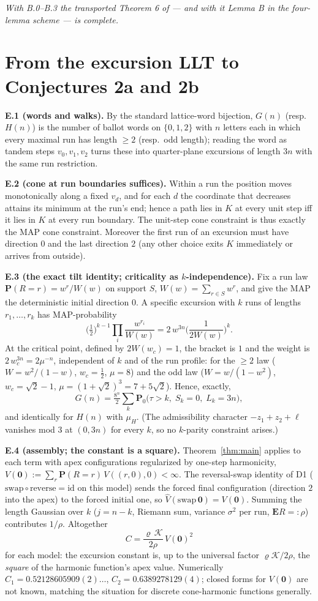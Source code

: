 \documentclass[11pt]{article}
\newcommand{\E}{\mathbf{E}}\newcommand{\Lat}{\mathcal{L}}\renewcommand{\Pr}{\mathbf{P}}
\begin{document}
\emph{With B.0--B.3 the transported Theorem 6 of \cite{DZ} --- and with it Lemma B in the
four-lemma scheme --- is complete.}

\section{From the excursion LLT to Conjectures 2a and 2b}
\textbf{E.1 (words and walks).} By the standard lattice-word bijection, $G(n)$ (resp.\
$H(n)$) is the number of ballot words on $\{0,1,2\}$ with $n$ letters each in which every
maximal run has length $\ge2$ (resp.\ odd length); reading the word as tandem steps
$v_0,v_1,v_2$ turns these into quarter-plane excursions of length $3n$ with the same run
restriction.

\textbf{E.2 (cone at run boundaries suffices).} Within a run the position moves
monotonically along a fixed $v_d$, and for each $d$ the coordinate that decreases attains
its minimum at the run's end; hence a path lies in $K$ at every unit step iff it lies in
$K$ at every run boundary. The unit-step cone constraint is thus exactly the MAP cone
constraint. Moreover the first run of an excursion must have direction $0$ and the last
direction $2$ (any other choice exits $K$ immediately or arrives from outside).

\textbf{E.3 (the exact tilt identity; criticality as $k$-independence).} Fix a run law
$\Pr(R=r)=w^r/W(w)$ on support $S$, $W(w)=\sum_{r\in S}w^r$, and give the MAP the
deterministic initial direction $0$. A specific excursion with $k$ runs of lengths
$r_1,\dots,r_k$ has MAP-probability
$$\Big(\tfrac12\Big)^{k-1}\prod_i\frac{w^{r_i}}{W(w)}
=2\,w^{3n}\Big(\frac{1}{2W(w)}\Big)^{k}.$$
At the critical point, defined by $2W(w_c)=1$, the bracket is $1$ and the weight is
$2\,w_c^{3n}=2\mu^{-n}$, independent of $k$ and of the run profile: for the $\ge2$ law
($W=w^2/(1-w)$, $w_c=\tfrac12$, $\mu=8$) and the odd law ($W=w/(1-w^2)$,
$w_c=\sqrt2-1$, $\mu=(1+\sqrt2)^3=7+5\sqrt2$). Hence, exactly,
$$G(n)=\tfrac{8^n}{2}\sum_k\Pr_0\big(\tau>k,\;S_k=0,\;L_k=3n\big),$$
and identically for $H(n)$ with $\mu_H$. (The admissibility character $-z_1+z_2+\ell$
vanishes mod $3$ at $(0,3n)$ for every $k$, so no $k$-parity constraint arises.)

\textbf{E.4 (assembly; the constant is a square).} Theorem~\ref{thm:main} applies to each
term with apex configurations regularized by one-step harmonicity,
$V(\mathbf0):=\sum_r\Pr(R=r)\,V((r,0),0)<\infty$. The reversal-swap identity of D1
($\mathrm{swap}\circ\mathrm{reverse}=\mathrm{id}$ on this model) sends the forced final
configuration (direction $2$ into the apex) to the forced initial one, so
$\widehat V(\mathrm{swap}\,\mathbf0)=V(\mathbf0)$. Summing the length Gaussian over $k$
($j=n-k$, Riemann sum, variance $\sigma^2$ per run, $\E R=:\rho$) contributes
$1/\rho$. Altogether
$$\boxed{\;C=\frac{\varrho\,\mathcal K}{2\rho}\,V(\mathbf0)^2\;}$$
for each model: the excursion constant is, up to the universal factor
$\varrho\mathcal K/2\rho$, the \emph{square} of the harmonic function's apex value.
Numerically $C_1=0.52128605909(2)\ldots$, $C_2=0.6389278129(4)$; closed forms for
$V(\mathbf0)$ are not known, matching the situation for discrete cone-harmonic functions
generally.
\end{document}
